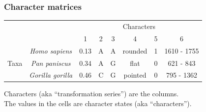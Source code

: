 \begin{frame}
    \frametitle{Character matrices}
\begin{table}[htdp]
\begin{center}
\begin{tabular}{|c|c|c|c|c|c|c|c|}
\hline
&  & \multicolumn{6}{c|}{Characters} \\
& & 1 & 2 & 3 & 4 & 5 & 6 \\
\hline
\multirow{3}{*}{Taxa} & {\em Homo sapiens} & 0.13 & A & A & rounded & 1 & 1610 - 1755 \\
 & {\em Pan paniscus} & 0.34 & A & G & flat & 0 & 621 - 843 \\
  & {\em Gorilla gorilla} & 0.46 & C & G & pointed & 0 & 795 - 1362\\
\hline
\end{tabular}
\end{center}
\end{table}
Characters (aka ``transformation series'') are the columns.\\
The values in the cells are character states (aka ``characters'').\\
\end{frame}

